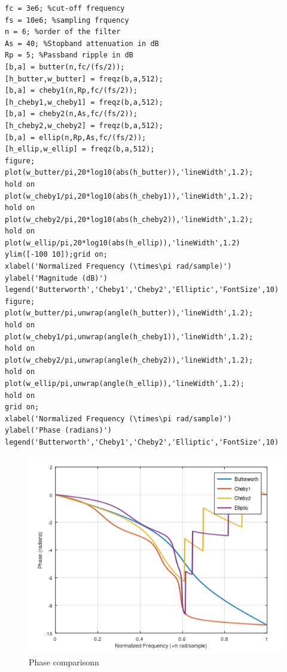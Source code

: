 \documentclass[12pt]{article}
\begin{document}
\begin{enumerate}
\begin{Verbatim}[frame = single]
fc = 3e6; %cut-off frequency
fs = 10e6; %sampling frquency
n = 6; %order of the filter
As = 40; %Stopband attenuation in dB
Rp = 5; %Passband ripple in dB
[b,a] = butter(n,fc/(fs/2)); 
[h_butter,w_butter] = freqz(b,a,512);
[b,a] = cheby1(n,Rp,fc/(fs/2));
[h_cheby1,w_cheby1] = freqz(b,a,512);
[b,a] = cheby2(n,As,fc/(fs/2));
[h_cheby2,w_cheby2] = freqz(b,a,512);
[b,a] = ellip(n,Rp,As,fc/(fs/2));
[h_ellip,w_ellip] = freqz(b,a,512);
figure;
plot(w_butter/pi,20*log10(abs(h_butter)),'lineWidth',1.2); 
hold on
plot(w_cheby1/pi,20*log10(abs(h_cheby1)),'lineWidth',1.2); 
hold on
plot(w_cheby2/pi,20*log10(abs(h_cheby2)),'lineWidth',1.2); 
hold on
plot(w_ellip/pi,20*log10(abs(h_ellip)),'lineWidth',1.2)
ylim([-100 10]);grid on;
xlabel('Normalized Frequency (\times\pi rad/sample)')
ylabel('Magnitude (dB)')
legend('Butterworth','Cheby1','Cheby2','Elliptic','FontSize',10)
figure;
plot(w_butter/pi,unwrap(angle(h_butter)),'lineWidth',1.2); 
hold on
plot(w_cheby1/pi,unwrap(angle(h_cheby1)),'lineWidth',1.2); 
hold on
plot(w_cheby2/pi,unwrap(angle(h_cheby2)),'lineWidth',1.2); 
hold on
plot(w_ellip/pi,unwrap(angle(h_ellip)),'lineWidth',1.2); 
hold on
grid on;
xlabel('Normalized Frequency (\times\pi rad/sample)')
ylabel('Phase (radians)')
legend('Butterworth','Cheby1','Cheby2','Elliptic','FontSize',10)
                                \end{Verbatim}
                                \begin{figure}[h!]
                                    \centering
                                    \includegraphics{labss/Lab6_4a.PNG}
                                    \caption{Phase comparisonn}


\end{figure}
\end{enumerate}
\end{document}
